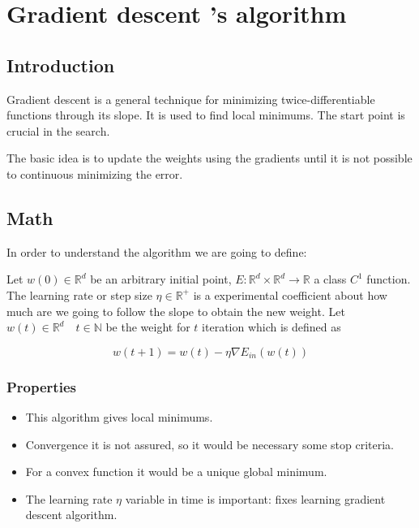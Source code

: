

\section{ Gradient descent 's algorithm }
\subsection{Introduction}

Gradient descent is a general technique for minimizing  twice-differentiable functions through its slope. \cite{LFD}
It is used to find local minimums. The start point is crucial in the search.  

The basic idea is to update the weights using the gradients until it is not possible to continuous minimizing the error.


\medskip

\subsection{Math}

In order to understand the algorithm we are going to define: 

Let $w(0) \in \mathbb{R}^d$ be an arbitrary initial point,
$E : \mathbb{R}^d \times \mathbb{R}^d \longrightarrow \mathbb R$
a class $C^1$ function. The learning rate or step size $\eta \in \mathbb{R}^+$
is a experimental coefficient about how much are we going to follow the slope to obtain the new weight.  
Let  $w(t) \in \mathbb{R}^d  \quad t \in \mathbb N$ be the weight for $t$ iteration which is defined as

\begin{equation*}
  w(t+1) = w(t) - \eta \nabla E_{in}(w(t))
\end{equation*}

\subsubsection{ Properties}

\begin{itemize}
\item This algorithm gives local minimums.
\item Convergence it is not assured, so it would be necessary some stop criteria. 
\item For a convex function it would be a unique global minimum.
\item The learning rate $\eta$ variable in time  is important: fixes learning gradient descent algorithm. 
\end{itemize}


